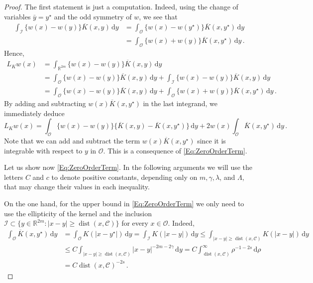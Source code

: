 \documentclass[12pt,reqno]{amsart}
\theoremstyle{definition}
\theoremstyle{remark}
\newcommand{\con}[1]{\mathbb{#1}}
\newcommand{\R}{\con{R}} %
\newcommand{\ccal}{\mathscr{C}}
\newcommand{\ical}{\mathcal{I}}
\newcommand{\ocal}{\mathcal{O}}
\newcommand{\s}{\gamma}
\renewcommand{\d}{\,\mathrm{d}} %
\DeclareMathOperator{\dist}{dist}
\numberwithin{equation}{section}
\begin{document}
\begin{proof}
	The first statement is just a computation. Indeed,  using the change of variables  $\bar{y} = y^\star$ and the odd symmetry of $w$, we see that
	\begin{align*}
	\int_{\ical}  \{w(x) - w(y) \} \overline{K}(x, y)\d y &= \int_{\ocal} \{w(x) - w(y^\star) \}\overline{K}(x, y^\star)\d y \\
	&= \int_{\ocal} \{w(x) + w(y) \}\overline{K}(x, y^\star)\d y\,.
	\end{align*}
	Hence,
	\begin{align*}
	L_K w (x) &= \int_{\R^{2m}}  \{w(x) - w(y) \} \overline{K}(x, y)\d y \\
	&= \int_{\ocal}  \{w(x) - w(y) \} \overline{K}(x, y)\d y +\int_{\ical}  \{w(x) - w(y) \} \overline{K}(x, y)\d y \\
	&= \int_{\ocal} \{w(x) - w(y) \} \overline{K}(x, y) \d y +  \int_{\ocal} \{w(x) + w(y) \} \overline{K}(x, y^\star) \d y \,.
	\end{align*}
	By adding and subtracting $w(x)\overline{K}(x, y^\star)$ in the last integrand, we immediately deduce
	$$
	L_K w (x) =  \int_{\ocal} \{w(x) - w(y) \} \{\overline{K}(x, y) - \overline{K}(x, y^\star)  \} \d y +  2 w(x) \int_{\ocal} \overline{K}(x, y^\star) \d y\,.
	$$
	Note that we can add and subtract the term $w(x)\overline{K}(x, y^\star)$  since it is integrable with respect to $y$ in $\ocal$. This is a consequence of \eqref{Eq:ZeroOrderTerm}.
	
	Let us show now \eqref{Eq:ZeroOrderTerm}. In the following arguments we will use the letters $C$ and $c$ to denote positive constants, depending only on $m, \s, \lambda$, and $\Lambda$, that may change their values in each inequality. 
	
	On the one hand, for the upper bound in \eqref{Eq:ZeroOrderTerm} we only need to use the ellipticity of the kernel and the inclusion $\ical \subset \{y\in\R^{2m}:|x-y|\geq \dist(x,\ccal)\}$ for every $x\in \ocal$. Indeed,
	\begin{align*}
	\int_{\ocal} \overline{K}(x, y^\star) \d y &=  \int_{\ocal} K(|x-y^\star|) \d y = \int_{\ical} K(|x-y|) \d y \leq \int_{|x-y|\geq \dist(x,\ccal)} K(|x-y|) \d y \\
	&\leq C \int_{|x-y|\geq \dist(x,\ccal)} |x-y|^{-2m-2\s} \d y = C \int_{\dist(x,\ccal)}^\infty \rho^{-1-2s} \d \rho \\
	&= C \dist(x,\ccal)^{-2s}\,.
	\end{align*}
	

\end{proof}
\end{document}
